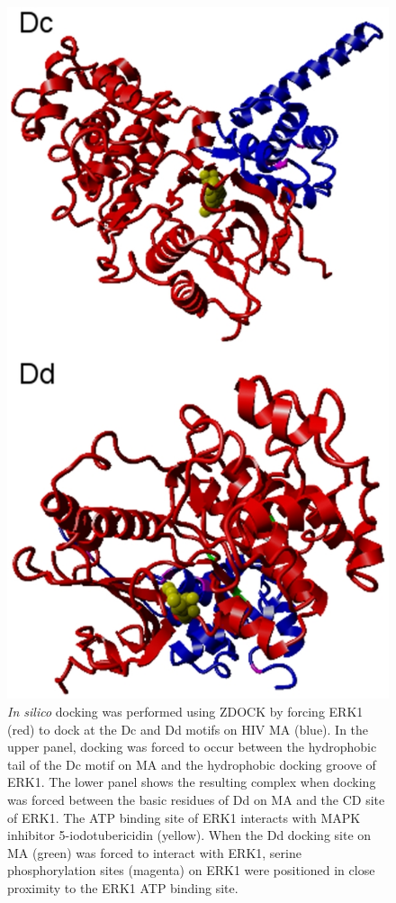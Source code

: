 \begin{figure}
\begin{center}
\includegraphics[scale=0.4]{figs/plos1_5}
\end{center}
\caption[Docking between MAPK ERK1 and HIV MA]{\small \textit{In silico} docking was
  performed using ZDOCK by forcing ERK1 (red) to dock at the Dc and Dd
  motifs on HIV MA (blue). In the upper panel, docking was forced to
  occur between the hydrophobic tail of the Dc motif on MA and the
  hydrophobic docking groove of ERK1. The lower panel shows the
  resulting complex when docking was forced between the basic residues
  of Dd on MA and the CD site of ERK1. The ATP binding site of ERK1
  interacts with MAPK inhibitor 5-iodotubericidin (yellow). When the
  Dd docking site on MA (green) was forced to interact with ERK1,
  serine phosphorylation sites (magenta) on ERK1 were positioned in
  close proximity to the ERK1 ATP binding
  site.  \label{fig:plos1:fig5}}
\end{figure}

